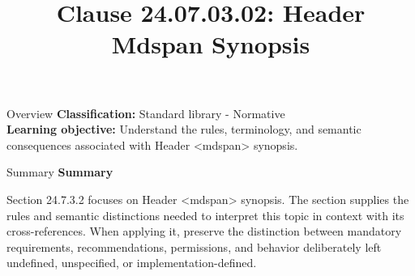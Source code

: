 \documentclass[10pt,letterpaper]{article}
\title{Clause 24.07.03.02: Header Mdspan Synopsis}
\author{}
\date{}
\begin{document}
\maketitle
\begin{CornellOverviewBox}{Overview}
\textbf{Classification:} Standard library - Normative\\[2pt]
\textbf{Learning objective:} Understand the rules, terminology, and semantic consequences associated with Header <mdspan> synopsis.
\end{CornellOverviewBox}\begin{CornellSummaryBox}{Summary}
{\sffamily\bfseries\color{Accent} Summary}\par\vspace{3pt}Section 24.7.3.2 focuses on Header <mdspan> synopsis. The section supplies the rules and semantic distinctions needed to interpret this topic in context with its cross-references. When applying it, preserve the distinction between mandatory requirements, recommendations, permissions, and behavior deliberately left undefined, unspecified, or implementation-defined.
\end{CornellSummaryBox}
\end{document}
